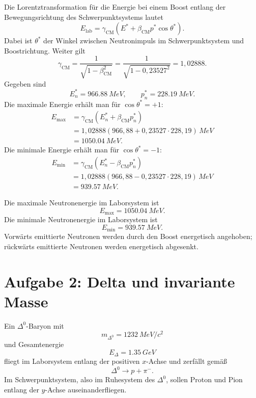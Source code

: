 \documentclass[11pt,a4paper]{scrartcl}
\newcommand{\paren}[1]{\left( #1 \right)}
\newcommand{\MeV}{\si{MeV}}
\newcommand{\pionm}{\pi^-}
\newcommand{\Dzero}{\Delta^0}
\newcommand{\betacm}{\beta_{\mathrm{CM}}}
\newcommand{\gammacm}{\gamma_{\mathrm{CM}}}
\theoremstyle{definition}
\theoremstyle{plain}
\theoremstyle{remark}
\begin{document}
\begin{calculationbox}
Die Lorentztransformation f\"ur die Energie bei einem Boost entlang der Bewegungsrichtung des Schwerpunktsystems lautet
\[
    E_{\mathrm{lab}}
    =\gammacm\paren{E^\ast+\betacm p^\ast\cos\theta^\ast}.
\]
Dabei ist $\theta^\ast$ der Winkel zwischen Neutronimpuls im Schwerpunktsystem und Boostrichtung. Weiter gilt
\[
    \gammacm=\frac{1}{\sqrt{1-\betacm^2}}
    =\frac{1}{\sqrt{1-0,23527^2}}
    =1,02888.
\]
Gegeben sind
\[
    E_n^\ast=\SI{966,88}{MeV},\qquad
    p_n^\ast=\SI{228,19}{MeV}.
\]
Die maximale Energie erh\"alt man f\"ur $\cos\theta^\ast=+1$:
\begin{align*}
    E_{\max}
    &=\gammacm\paren{E_n^\ast+\betacm p_n^\ast} \\
    &=1,02888\paren{966,88+0,23527\cdot 228,19}\,\MeV \\
    &=\SI{1050,04}{MeV}.
\end{align*}
Die minimale Energie erh\"alt man f\"ur $\cos\theta^\ast=-1$:
\begin{align*}
    E_{\min}
    &=\gammacm\paren{E_n^\ast-\betacm p_n^\ast} \\
    &=1,02888\paren{966,88-0,23527\cdot 228,19}\,\MeV \\
    &=\SI{939,57}{MeV}.
\end{align*}
\end{calculationbox}

\begin{answerbox}
Die maximale Neutronenergie im Laborsystem ist
\[
    \boxed{E_{\max}=\SI{1050,04}{MeV}}.
\]
Die minimale Neutronenergie im Laborsystem ist
\[
    \boxed{E_{\min}=\SI{939,57}{MeV}}.
\]
Vorw\"arts emittierte Neutronen werden durch den Boost energetisch angehoben; r\"uckw\"arts emittierte Neutronen werden energetisch abgesenkt.
\end{answerbox}

\FloatBarrier
\newpage

\section{Aufgabe 2: Delta und invariante Masse}

\begin{taskbox}
Ein $\Dzero$-Baryon mit
\[
    m_{\Dzero}=\SI{1232}{MeV}/c^2
\]
und Gesamtenergie
\[
    E_\Delta=\SI{1,35}{GeV}
\]
fliegt im Laborsystem entlang der positiven $x$-Achse und zerf\"allt gem\"a\ss
\[
    \Dzero \longrightarrow p+\pionm.
\]
Im Schwerpunktsystem, also im Ruhesystem des $\Dzero$, sollen Proton und Pion entlang der $y$-Achse auseinanderfliegen.
\end{taskbox}
\end{document}
